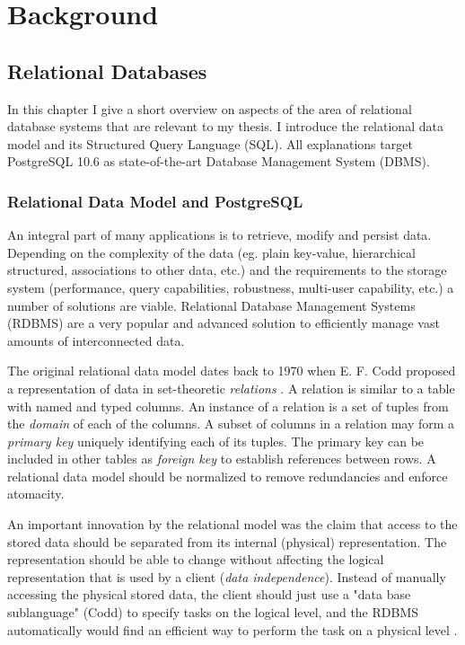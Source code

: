 \chapter{Background}\label{background}

\section{Relational Databases}\label{theory}

In this chapter I give a short overview on aspects of the area of relational database systems that are relevant to my thesis. I introduce the relational data model and its Structured Query Language (SQL). All explanations target PostgreSQL 10.6 as state-of-the-art Database Management System (DBMS).

\subsection{Relational Data Model and PostgreSQL}
An integral part of many applications is to retrieve, modify and persist data. Depending on the complexity of the data (eg. plain key-value, hierarchical structured, associations to other data, etc.) and the requirements to the storage system (performance, query capabilities, robustness, multi-user capability, etc.) a number of solutions are viable. Relational Database Management Systems (RDBMS) are a very popular and advanced solution to efficiently manage vast amounts of interconnected data.

The original relational data model dates back to 1970 when E. F. Codd proposed a representation of data in set-theoretic \textit{relations} \cite{codd}. A relation is similar to a table with named and typed columns. An instance of a relation is a set of tuples from the \textit{domain} of each of the columns. A subset of columns in a relation may form a \textit{primary key} uniquely identifying each of its tuples. The primary key can be included in other tables as \textit{foreign key} to establish references between rows. A relational data model should be normalized to remove redundancies and enforce atomacity.

An important innovation by the relational model was the claim that access to the stored data should be separated from its internal (physical) representation. The representation should be able to change without affecting the logical representation that is used by a client (\textit{data independence}). Instead of manually accessing the physical stored data, the client should just use a "data base sublanguage" (Codd) to specify tasks on the logical level, and the RDBMS automatically would find an efficient way to perform the task on a physical level \cite[p. 3 ff.]{FoD}.

